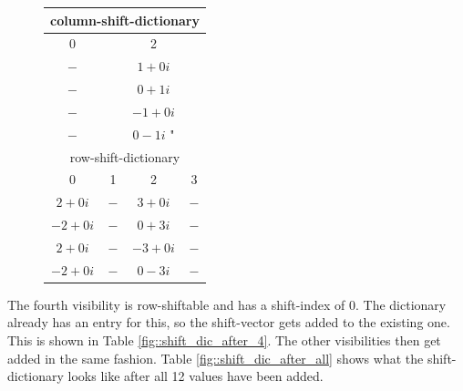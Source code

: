 \documentclass[12pt]{article}
\begin{document}
\begin{figure} [h]
	\begin{center}
		\begin{tabular}{||c c c c||} 
			\hline
			\multicolumn{4}{||c||}{column-shift-dictionary} \\
			\hline
			\hline
			 0  &  & 2 &    \\ [0.5ex] 
			\hline
			$-$ & & $1+0i$ & \\
			\hline
			$-$ & & $0+1i$ & \\
			\hline
			$-$ & & $-1+0i$ & \\
			\hline
			$-$ & & $0-1i$ " & \\
			\hline\hline
			\multicolumn{4}{||c||}{row-shift-dictionary} \\
			\hline
			\hline
			0 & 1 & 2 & 3 \\
			\hline
			$2+0i$ & $-$ & $3+0i$ & $-$ \\
			\hline
			$-2+0i$ & $-$ & $0+3i$ & $-$ \\
			\hline
			$2+0i$ & $-$ & $-3+0i$ & $-$ \\
			\hline
			$-2+0i$ & $-$ & $0-3i$ & $-$ \\
			\hline
		\end{tabular}
	\end{center}
\label{fig::shift_dic_after_3}
\end{figure}

The fourth visibility is row-shiftable and has a shift-index of 0. The dictionary already has an entry for this, so the shift-vector gets added to the existing one. This is shown in Table \ref{fig::shift_dic_after_4}. The other visibilities then get added in the same fashion. Table \ref{fig::shift_dic_after_all} shows what the shift-dictionary looks like after all 12 values have been added.
\end{document}
